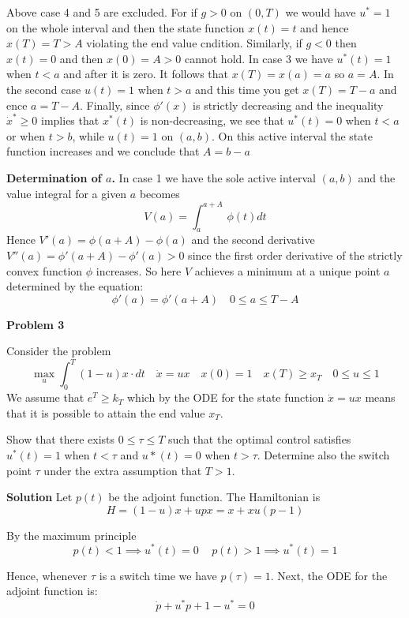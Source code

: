 \documentclass{amsart}
\begin{document}
\noindent
Above case 4 and 5 are excluded. For if $g>0$ on $(0,T)$ 
we would have $u^*=1$ on the whole interval and then
the state function $x(t)=t$ and hence $x(T)=T>A$ violating
the end value cndition. Similarly, if $g<0$ then
$x(t)=0$ and then $x(0)=A>0$ cannot hold.
In case 3 we have $u^*(t)=1$ when $t<a$ and after it is zero. It follows that
$x(T)=x(a)=a$ so $a=A$.  In the second case $u(t)=1$ when
$t>a$ and this time you get $x(T)=T-a$ and ence $a=T-A$.
Finally, since $\phi'(x)$ is strictly decreasing
and the inequality $\dot x^*\geq 0$ implies that $x^*(t)$
is non-decreasing, we see that $u^*(t)=0$ when $t<a$ or when $t>b$, while 
$u(t)=1$ on $(a,b)$. On this active interval the state function increases and we conclude that
$A=b-a$

\noindent
{\bf Determination of $a$.} In case 1 we have the sole active interval $(a,b)$
and  the value integral for a given $a$ becomes
\[
V(a)=\int_a^{a+A}\,\phi(t)dt
\]
Hence $V'(a)=\phi(a+A)-\phi(a)$ and the second derivative
$V''(a)=\phi'(a+A)-\phi'(a)>0$ since 
the first order derivative of the strictly convex function $\phi$ increases.
So here $V$ achieves a minimum at a unique point $a$  determined by
the equation:
\[
\phi'(a)=\phi'(a+A)\quad 0\leq a\leq T-A
\]



\bigskip



\centerline{\bf\large Problem 3}
\medskip

\noindent
Consider the  problem
\begin{equation*}
\max_u\int_0^T(1-u)x\cdot dt \quad \dot x= ux \quad
x(0)=1 \quad x(T)\geq x_T\quad 0\leq u\leq 1
\end{equation*} 
We  assume that $e^T\geq k_T$ which by the ODE for the state function
$\dot x=ux$ means that it is possible to attain the end value $x_T$.
\medskip

Show  that there exists $0\leq\tau\leq T$ such that the optimal control 
satisfies $u^*(t)=1$ when $t<\tau$ and
$u*(t)=0$ when $t>\tau$. Determine also the switch point $\tau$ under the 
extra assumption that $T>1$.
\medskip

\noindent
{\bf Solution}
Let $p(t)$ be the adjoint function. The Hamiltonian is 
\[
H=(1-u)x+upx=x+xu(p-1)\tag{1}
\]




\noindent
By the maximum principle
\[
p(t)<1\implies u^*(t)=0\quad\, p(t)>1 \implies u^*(t)=1\tag{2}
\]

\noindent
Hence, whenever $\tau$ is a switch time we  have $p(\tau)=1$.
Next,
the ODE for the adjoint function is:
\[
\dot p+u^*p+1-u^*=0\tag{3}
\]
\medskip
\end{document}
